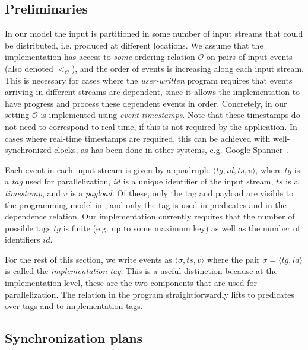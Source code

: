 \subsection{Preliminaries}
\label{dgs:ssec:distributed-assumptions}

In our model the input is partitioned in some number of input streams that could be distributed, i.e. produced at different locations.
We assume that the implementation has access to \emph{some} ordering
relation $\mathcal{O}$ on pairs of input events (also denoted
$<_{\mathcal{O}}$), and the order of events is increasing along each
input stream. This is necessary for cases where the
\emph{user-written} program requires that events arriving in
different streams are dependent, since it allows the implementation to
have progress and process these dependent events in order.
Concretely, in our setting $\mathcal{O}$ is implemented using \emph{event timestamps}.
Note that these timestamps do not need to correspond to real time, if this is not required by the application.
In cases where real-time timestamps are required, this can be achieved with well-synchronized clocks, as has been done in other systems, e.g. Google Spanner~\cite{corbett2013spanner}.

Each event in each input stream is given by a quadruple $\langle tg, id, ts, v \rangle$,
where $tg$ is a \emph{tag} used for parallelization, $id$ is a unique identifier of the input stream, $ts$ is a \emph{timestamp}, and $v$ is a \emph{payload}.
Of these, only the tag and payload are visible to the programming model
in , and only the tag is used in predicates and
in the dependence relation.
Our implementation currently requires that the number of possible tags $tg$ is finite (e.g. up to some maximum key) as well as the number of identifiers $id$.

For the rest of this section,
we write events as $\langle \sigma, ts, v \rangle$
where the pair $\sigma = \langle tg, id \rangle$ is called the \emph{implementation tag}.
This is a useful distinction because at the implementation level,
these are the two components that are used for parallelization.
The
relation  in the program straightforwardly lifts to predicates over tags and to implementation tags.

\subsection{Synchronization plans}
\label{dgs:ssec:distributed-configurations}

